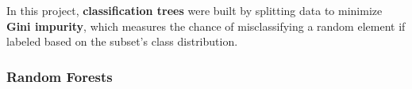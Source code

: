 \documentclass[fleqn,moreauthors,10pt]{ds_report}
\begin{document}
%

In this project, \textbf{classification trees} were built by splitting data to minimize \textbf{Gini impurity}, which measures the chance of misclassifying a random element if labeled based on the subset's class distribution\cite{MLPP}.

%
%

\subsubsection*{Random Forests}
\end{document}
